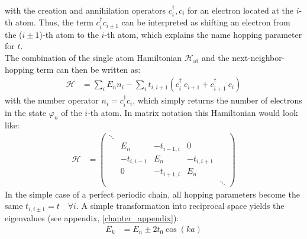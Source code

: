 with the creation and annihilation operators $c^\dagger_i, c_i$ for an electron located at the $i$-th atom. Thus, the term $c_i^\dagger c_{i\pm1}$ can be interpreted as shifting an electron from the ($i\pm1$)-th atom to the $i$-th atom, which explains the name hopping parameter for $t$.\\
The combination of the single atom Hamiltonian $\mathcal{H}_\text{at}$ and the next-neighbor-hopping term can then be written as:
\begin{align}
	\mathcal{H} &= \sum_i E_n n_i - \sum_i t_{i, i+1} \left(c_i^\dagger\  c_{i+1} + c_{i+1}^\dagger\  c_i\right)
\end{align}
with the number operator $n_i = c^\dagger_i c_i$, which simply returns the number of electrons in the state $\varphi_n$ of the $i$-th atom. In matrix notation this Hamiltonian would look like:
\begin{align}
	\mathcal{H} &= \begin{pmatrix*}
	\ddots&&&\\
	&E_n&-t_{i-1, i}&0\\
	&-t_{i, i-1}&E_n&-t_{i, i+1}\\
	&0&-t_{i+1, i}&E_n&\\
	&&&&\ddots
	\end{pmatrix*}
\end{align}
In the simple case of a perfect periodic chain, all hopping parameters become the same $t_{i, i\pm1} = t\quad\forall  i$. A simple transformation into reciprocal space yields the eigenvalues (see appendix, \cref{chapter_appendix}):
\begin{align}
E_k &= E_n \pm 2t_0\cos(ka)
\end{align}

